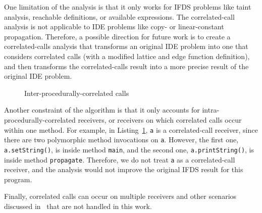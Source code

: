 One limitation of the analysis is that it only works for IFDS problems like taint analysis, reachable definitions, or available expressions. The correlated-call analysis is not applicable to IDE problems like copy- or linear-constant propagation. Therefore, a possible direction for future work is to create a correlated-calls analysis that transforms an original IDE problem into one that considers correlated calls (with a modified lattice and edge function definition), and then transforms the correlated-calls result into a more precise result of the original IDE problem.

\begin{figure}
  \centering
  \begin{minipage}{\textwidth}
  \end{minipage}
  \caption{Inter-procedurally-correlated calls}
  \label{list:interProcRec}
\end{figure}

Another constraint of the algorithm is that it only accounts for intra-procedurally-correlated receivers, or receivers on which correlated calls occur within one method. For example, in Listing~\ref{list:interProcRec}, \verb'a' is a correlated-call receiver, since there are two polymorphic method invocations on \verb'a'. However, the first one, \verb'a.setString()', is inside method \verb'main', and the second one, \verb'a.printString()', is inside method \verb'propagate'. Therefore, we do not treat \verb'a' as a correlated-call receiver, and the analysis would not improve the original IFDS result for this program.

Finally, correlated calls can occur on multiple receivers and other scenarios discussed in~\cite{frank2014correlated} that are not handled in this work.
